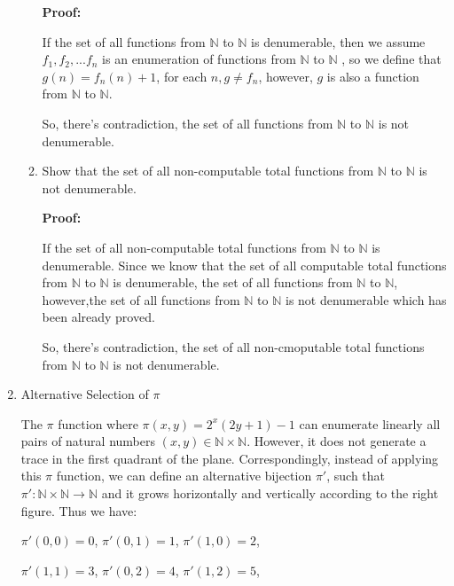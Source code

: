 \documentclass[12pt,a4paper]{article}
\theoremstyle{definition}
\numberwithin{equation}{section}
\numberwithin{figure}{section}
\begin{document}
\begin{enumerate}
\begin{enumerate}
\textbf{Proof:}

If the set of all functions from $ \mathbb{N} $ to $ \mathbb{N} $ is denumerable, then we assume $f_1, f_2, ...f_n $ is an enumeration of functions from $ \mathbb{N} $ to $ \mathbb{N} $ , so we define that $g(n) = f_n(n) +1$, for each $n , g \neq f_n$, however, $g$ is also a function from  $ \mathbb{N} $ to $ \mathbb{N} $.

So, there's contradiction, the set of all functions from $ \mathbb{N} $ to $ \mathbb{N} $ is not denumerable.

\item Show that the set of all non-computable total functions from $\mathbb{N}$ to $\mathbb{N}$ is not denumerable.

\textbf{Proof:}

If the set of all non-computable total functions from $\mathbb{N}$ to $\mathbb{N}$ is denumerable. Since we know that the set of all computable total functions from $\mathbb{N}$ to $\mathbb{N}$ is denumerable, the set of all functions from $\mathbb{N}$ to $\mathbb{N}$, however,the set of all functions from $\mathbb{N}$ to $\mathbb{N}$ is not denumerable which has been already proved.

So, there's contradiction, the set of all non-cmoputable total functions from $\mathbb{N}$ to $\mathbb{N}$ is not denumerable.



\end{enumerate}

\item Alternative Selection of $\pi$

  \begin{minipage}[t]{0.68\linewidth}
  The $\pi$ function where $\pi(x,y)=2^x (2y+1)-1$ can enumerate linearly all pairs of natural numbers $ (x,y) \in \mathbb{N}\times \mathbb{N}$. However, it does not generate a trace in the first quadrant of the plane. Correspondingly, instead of applying this $\pi$ function, we can define an alternative bijection $\pi'$, such that $\pi': \mathbb{N}\times \mathbb{N} \rightarrow \mathbb{N}$ and it grows horizontally and vertically according to the right figure. Thus we have:

    \vspace{1mm}
  $\pi'(0,0)=0$, $\pi'(0,1)=1$, $\pi'(1,0)=2$,

  $\pi'(1,1)=3$, $\pi'(0,2)=4$, $\pi'(1,2)=5$, 


\end{minipage}
\end{enumerate}
\end{document}
